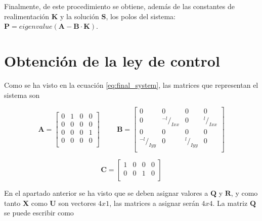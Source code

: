 \documentclass[twoside,11pt]{book}
\begin{document}

Finalmente, de este procedimiento se obtiene, además de las constantes de realimentación $\mathbf{K}$ y la solución $\mathbf{S}$, los polos del sistema: $\mathbf{P}=eigenvalue( \mathbf{A} - \mathbf{B} \cdot \mathbf{K})$.


\section{Obtención de la ley de control}

Como se ha visto en la ecuación \ref{eq:final_system}, las matrices que representan el sistema son

\begin{equation}
\pmb{A}= \left[ \begin{array}{cccc}
0 & 1 & 0 & 0 \\
0 & 0 & 0 & 0 \\
0 & 0 & 0 & 1 \\
0 & 0 & 0 & 0 \\ \end{array} \right] \hspace{1cm} \pmb{B}=\left[ \begin{array}{cccc}
0 & 0 & 0 & 0 \\
0 & {}^{-l}/_{Ixx} & 0 & {}^{l}/_{Ixx} \\ 
0 & 0 & 0 & 0 \\
{}^{-l}/_{Iyy} & 0 & {}^{l}/_{Iyy} & 0 \\ \end{array} \right] 
\end{equation} 

\begin{equation}
\nonumber
\pmb{C}=\left[ \begin{array}{cccc}
1 & 0 & 0 & 0 \\
0 & 0 & 1 & 0 \\ \end{array} \right] 
\end{equation} 

En el apartado anterior se ha visto que se deben asignar valores a $\mathbf{Q}$ y $\mathbf{R}$, y como tanto $\mathbf{X}$ como $\mathbf{U}$ son vectores $4x1$, las matrices a asignar serán $4x4$. La matriz $\mathbf{Q}$ se puede escribir como 
\end{document}
